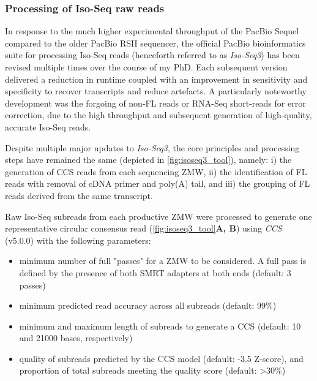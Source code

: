 \clearpage
\subsubsection{Processing of Iso-Seq raw reads}
\label{section: Isoseq_rawprocessing}
In response to the much higher experimental throughput of the PacBio Sequel compared to the older PacBio RSII sequencer, the official PacBio bioinformatics suite for processing Iso-Seq reads (henceforth referred to as \textit{Iso-Seq3}) has been revised multiple times over the course of my PhD. Each subsequent version delivered a reduction in runtime coupled with an improvement in sensitivity and specificity to recover transcripts and reduce artefacts. A particularly noteworthy development was the forgoing of non-FL reads or RNA-Seq short-reads for error correction, due to the high throughput and subsequent generation of high-quality, accurate Iso-Seq reads. 

Despite multiple major updates to \textit{Iso-Seq3}, the core principles and processing steps have remained the same (depicted in \cref{fig:isoseq3_tool}), namely: i) the generation of CCS reads from each sequencing ZMW, ii) the identification of FL reads with removal of cDNA primer and poly(A) tail, and iii) the grouping of FL reads derived from the same transcript. 

Raw Iso-Seq subreads from each productive ZMW were processed to generate one representative circular consensus read (\cref{fig:isoseq3_tool}\textbf{A, B}) using \textit{CCS} (v5.0.0) with the following parameters: 
\begin{itemize}
	\item minimum number of full "passes" for a ZMW to be considered. A full pass is defined by the presence of both SMRT adapters at both ends (default: 3 passes)
	\item minimum predicted read accuracy across all subreads (default: 99\%)
	\item minimum and maximum length of subreads to generate a CCS (default: 10 and 21000 bases, respectively)
	\item quality of subreads predicted by the CCS model (default: -3.5 Z-score), and proportion of total subreads meeting the quality score (default: \textgreater 30\%)
\end{itemize}


